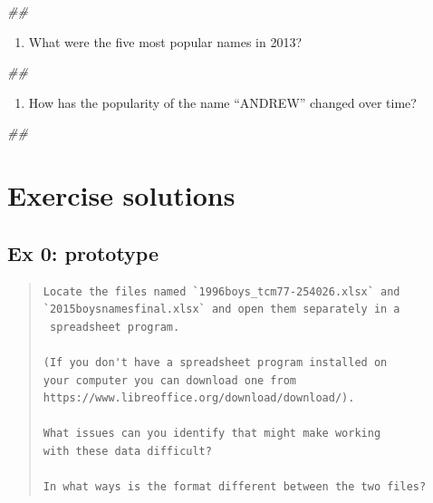 \documentclass[
]{book}
\newenvironment{Shaded}{\begin{snugshade}}{\end{snugshade}}
\newcommand{\CommentTok}[1]{\textcolor[rgb]{0.56,0.35,0.01}{\textit{#1}}}
\providecommand{\tightlist}{%
  \setlength{\itemsep}{0pt}\setlength{\parskip}{0pt}}
\begin{document}
\begin{Shaded}
\begin{Highlighting}[]
\CommentTok{## }
\end{Highlighting}
\end{Shaded}

\begin{enumerate}
\def\labelenumi{\arabic{enumi}.}
\setcounter{enumi}{2}
\tightlist
\item
  What were the five most popular names in 2013?
\end{enumerate}

\begin{Shaded}
\begin{Highlighting}[]
\CommentTok{## }
\end{Highlighting}
\end{Shaded}

\begin{enumerate}
\def\labelenumi{\arabic{enumi}.}
\setcounter{enumi}{3}
\tightlist
\item
  How has the popularity of the name ``ANDREW'' changed over time?
\end{enumerate}

\begin{Shaded}
\begin{Highlighting}[]
\CommentTok{## }
\end{Highlighting}
\end{Shaded}

\hypertarget{exercise-solutions-3}{%
\section{Exercise solutions}\label{exercise-solutions-3}}

\hypertarget{ex-0-prototype-3}{%
\subsection{Ex 0: prototype}\label{ex-0-prototype-3}}

\begin{quote}
\begin{verbatim}
Locate the files named `1996boys_tcm77-254026.xlsx` and 
`2015boysnamesfinal.xlsx` and open them separately in a 
 spreadsheet program. 

(If you don't have a spreadsheet program installed on
your computer you can download one from
https://www.libreoffice.org/download/download/). 

What issues can you identify that might make working
with these data difficult?

In what ways is the format different between the two files?
\end{verbatim}
\end{quote}
\end{document}
